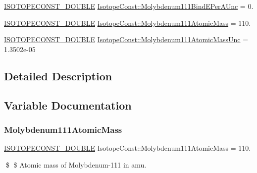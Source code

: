 \begin{DoxyCompactItemize}
\item 
\mbox{\hyperlink{group___isotope_const-_macros_ga8f45a7272ce02c0b4c65c44636ed719a}{I\+S\+O\+T\+O\+P\+E\+C\+O\+N\+S\+T\+\_\+\+D\+O\+U\+B\+LE}} \mbox{\hyperlink{group___isotope_const-_molybdenum-_mo111_ga27789273455afa248b4ea4a23966a244}{Isotope\+Const\+::\+Molybdenum111\+Bind\+E\+Per\+A\+Unc}} = 0.
\item 
\mbox{\hyperlink{group___isotope_const-_macros_ga8f45a7272ce02c0b4c65c44636ed719a}{I\+S\+O\+T\+O\+P\+E\+C\+O\+N\+S\+T\+\_\+\+D\+O\+U\+B\+LE}} \mbox{\hyperlink{group___isotope_const-_molybdenum-_mo111_ga45989d215b55aa2fb4d2ae62e11ada4a}{Isotope\+Const\+::\+Molybdenum111\+Atomic\+Mass}} = 110.
\item 
\mbox{\hyperlink{group___isotope_const-_macros_ga8f45a7272ce02c0b4c65c44636ed719a}{I\+S\+O\+T\+O\+P\+E\+C\+O\+N\+S\+T\+\_\+\+D\+O\+U\+B\+LE}} \mbox{\hyperlink{group___isotope_const-_molybdenum-_mo111_gadc3bf1cf9969ab2254c901dd0a624872}{Isotope\+Const\+::\+Molybdenum111\+Atomic\+Mass\+Unc}} = 1.\+3502e-\/05
\end{DoxyCompactItemize}


\subsection{Detailed Description}


\subsection{Variable Documentation}
\mbox{\label{group___isotope_const-_molybdenum-_mo111_ga45989d215b55aa2fb4d2ae62e11ada4a}} 
\subsubsection{\texorpdfstring{Molybdenum111\+Atomic\+Mass}{Molybdenum111AtomicMass}}
{\footnotesize\ttfamily \mbox{\hyperlink{group___isotope_const-_macros_ga8f45a7272ce02c0b4c65c44636ed719a}{I\+S\+O\+T\+O\+P\+E\+C\+O\+N\+S\+T\+\_\+\+D\+O\+U\+B\+LE}} Isotope\+Const\+::\+Molybdenum111\+Atomic\+Mass = 110.}

\$ \$ Atomic mass of Molybdenum-\/111 in amu. \mbox{\label{group___isotope_const-_molybdenum-_mo111_gadc3bf1cf9969ab2254c901dd0a624872}} 

